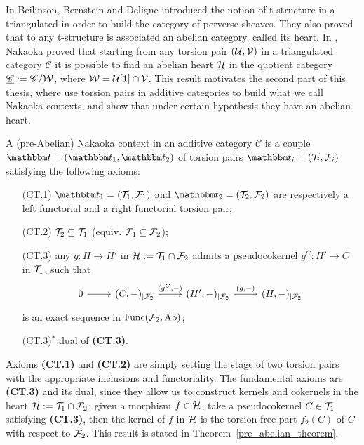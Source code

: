 
In \cite{bbd82} Beilinson, Bernstein and Deligne introduced the notion of t-structure in a triangulated in order to build the category of perverse sheaves. They also proved that to any t-structure is associated an abelian category, called its heart. In \cite{Nakaoka}, Nakaoka proved that starting from any torsion pair $(\mathcal{U},\mathcal{V})$ in a triangulated category $\mathscr{C}$ it is possible to find an abelian heart $\underline{\mathcal{H}}$ in the quotient category $\underline{\mathscr{C}}:=\mathscr{C}/\mathcal{W}$, where $\mathcal{W}=\mathcal{U}[1]\cap\mathcal{V}$. This result motivates the second part of this thesis, where use torsion pairs in additive categories to build what we call Nakaoka contexts, and show that under certain hypothesis they have an abelian heart.

A (pre-Abelian) Nakaoka context in an additive category $\mathscr{C}$ is a couple $\t=(\t_1,\t_2)$ of torsion pairs $\t_i=(\T_i,\F_i)$ satisfying the following axioms:

\begin{enumerate}
  \item[(CT.1)] $\t_1=(\T_1,\F_1)$ and $\t_2=(\T_2,\F_2)$ are respectively a left functorial and a right functorial torsion pair;
  \item[(CT.2)] $\mathcal{T}_2\subseteq \mathcal{T}_1$ (equiv. $\mathcal{F}_1\subseteq\mathcal{F}_2$);
  \item[(CT.3)] any  $g\colon H\to H'$ in $\mathcal{H}:=\mathcal{T}_1\cap\mathcal{F}_2$ admits a pseudocokernel $g^C\colon H'\to C$ in $\mathcal{T}_1$, such that
    \begin{equation*}
      \begin{tikzcd}
        0\arrow{r} &(C,-)_{|\F_2}\arrow{r}{(g^C,-)} & (H',-)_{|\F_2}\arrow{r}{(g,-)}& (H,-)_{|\F_2}
      \end{tikzcd}
    \end{equation*}
    is an exact sequence in $\mathrm{Func}(\mathcal{F}_2,\mathrm{Ab})$;
  \item[(CT.3)$^\ast$] dual of \textbf{(CT.3)}.
\end{enumerate}

Axioms \textbf{(CT.1)} and \textbf{(CT.2)} are simply setting the stage of two torsion pairs with the appropriate inclusions and functoriality. The fundamental axioms are \textbf{(CT.3)} and its dual, since they allow us to construct kernels and cokernels in the heart $\mathcal{H}:=\mathcal{T}_1\cap\mathcal{F}_2$: given a morphism $f\in\mathcal{H}$, take a pseudocokernel $C\in\mathcal{T}_1$ satisfying \textbf{(CT.3)}, then the kernel of $f$ in $\mathcal{H}$ is the torsion-free part $f_2(C)$ of $C$ with respect to $\mathcal{F}_2$. This result is stated in Theorem~\ref{pre_abelian_theorem}.

